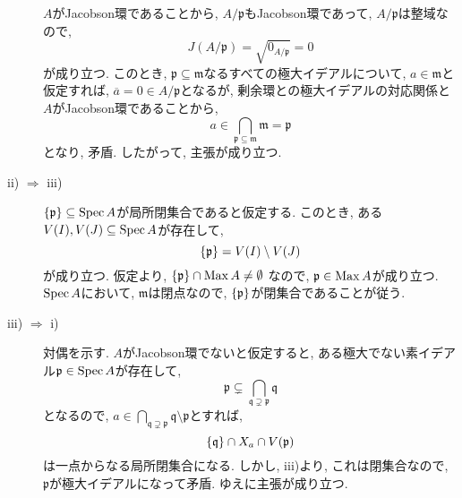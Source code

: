 \documentclass[dvipdfmx]{jsarticle}
\begin{document}
\begin{problem}
\begin{description}
            $A$がJacobson環であることから, $A/\mathfrak{p}$もJacobson環であって,
            $A/\mathfrak{p}$は整域なので,
            \[
                J(A/\mathfrak{p}) = \sqrt{0_{A/\mathfrak{p}}} = 0
            \]
            が成り立つ.
            このとき, $\mathfrak{p} \subseteq \mathfrak{m}$なるすべての極大イデアルについて, $a \in \mathfrak{m}$と仮定すれば,
            $\overline{a} = 0 \in A/\mathfrak{p}$となるが,
            剰余環との極大イデアルの対応関係と$A$がJacobson環であることから,
            \[
                a \in \bigcap_{\mathfrak{p} \subseteq \mathfrak{m}} \mathfrak{m} = \mathfrak{p}
            \]
            となり, 矛盾.
            したがって, 主張が成り立つ.
            \item[ii) $\Rightarrow$ iii)]
            $\{\mathfrak{p}\} \subseteq \operatorname{Spec}{A}$が局所閉集合であると仮定する.
            このとき, ある$V(I), V(J) \subseteq \operatorname{Spec}{A}$が存在して,
            \[
                \{\mathfrak{p}\} = V(I) \setminus V(J)
            \]
            が成り立つ.
            仮定より, $\{\mathfrak{p}\} \cap \operatorname{Max}{A} \neq \emptyset$
            なので, $\mathfrak{p} \in \operatorname{Max}{A}$が成り立つ.
            $\operatorname{Spec}{A}$において, $\mathfrak{m}$は閉点なので, $\{\mathfrak{p}\}$が閉集合であることが従う.
            \item [iii) $\Rightarrow$ i)]
            対偶を示す.
            $A$がJacobson環でないと仮定すると, ある極大でない素イデアル$\mathfrak{p} \in \operatorname{Spec}{A}$が存在して,
            \[
                \mathfrak{p} \subsetneq \bigcap_{\mathfrak{q} \supsetneq \mathfrak{p}} \mathfrak{q}
            \]
            となるので, $a \in  \bigcap_{\mathfrak{q} \supsetneq \mathfrak{p}} \mathfrak{q} \setminus \mathfrak{p}$とすれば,
            \[
                \{\mathfrak{q}\} \cap X_a \cap V(\mathfrak{p})
            \]
            は一点からなる局所閉集合になる.
            しかし, iii)より, これは閉集合なので, $\mathfrak{p}$が極大イデアルになって矛盾.
            ゆえに主張が成り立つ.
        \end{description}
    \end{problem}
\end{document}
